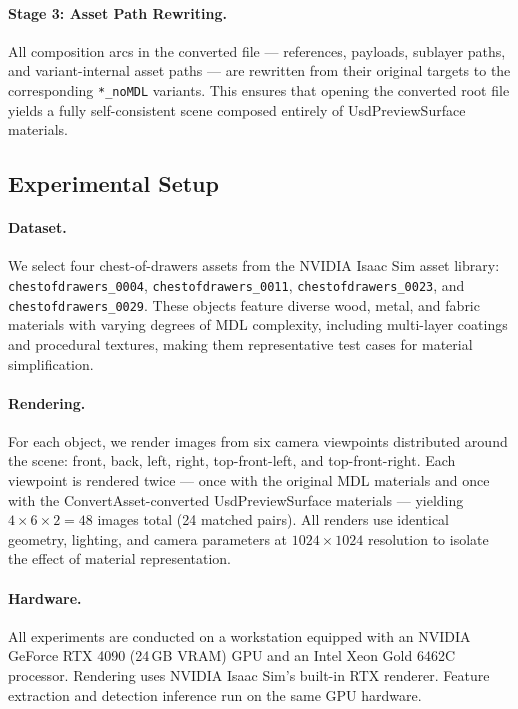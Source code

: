 \paragraph{Stage 3: Asset Path Rewriting.}
All composition arcs in the converted file --- references, payloads, sublayer
paths, and variant-internal asset paths --- are rewritten from their original
targets to the corresponding \texttt{*\_noMDL} variants. This ensures that
opening the converted root file yields a fully self-consistent scene composed
entirely of UsdPreviewSurface materials.

\subsection{Experimental Setup}
\label{sec:setup}

\paragraph{Dataset.}
We select four chest-of-drawers assets from the NVIDIA Isaac Sim asset library:
\texttt{chestofdrawers\_0004}, \texttt{chestofdrawers\_0011},
\texttt{chestofdrawers\_0023}, and \texttt{chestofdrawers\_0029}. These objects
feature diverse wood, metal, and fabric materials with varying degrees of MDL
complexity, including multi-layer coatings and procedural textures, making them
representative test cases for material simplification.

\paragraph{Rendering.}
For each object, we render images from six camera viewpoints distributed around
the scene: front, back, left, right, top-front-left, and top-front-right. Each viewpoint
is rendered twice --- once with the original MDL materials and once with the
ConvertAsset-converted UsdPreviewSurface materials --- yielding $4 \times 6
\times 2 = 48$ images total (24 matched pairs). All renders use identical
geometry, lighting, and camera parameters at $1024 \times 1024$ resolution to
isolate the effect of material representation.

\paragraph{Hardware.}
All experiments are conducted on a workstation equipped with an NVIDIA GeForce
RTX 4090 (24\,GB VRAM) GPU and an Intel Xeon Gold 6462C processor. Rendering uses NVIDIA Isaac Sim's
built-in RTX renderer. Feature extraction and detection inference run on the
same GPU hardware.

